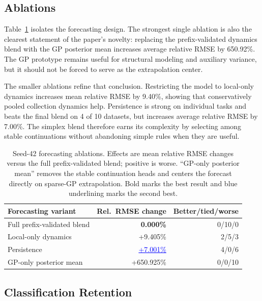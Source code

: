 \documentclass[11pt]{article}
\newcommand{\best}[1]{\textbf{#1}}
\newcommand{\second}[1]{\textcolor{blue}{\underline{#1}}}
\begin{document}
\subsection{Ablations}

Table~\ref{tab:forecast-ablations} isolates the forecasting design. The strongest single ablation is also the clearest statement of the paper's novelty: replacing the prefix-validated dynamics blend with the GP posterior mean increases average relative RMSE by 650.92\%. The GP prototype remains useful for structural modeling and auxiliary variance, but it should not be forced to serve as the extrapolation center.

The smaller ablations refine that conclusion. Restricting the model to local-only dynamics increases mean relative RMSE by 9.40\%, showing that conservatively pooled collection dynamics help. Persistence is strong on individual tasks and beats the final blend on 4 of 10 datasets, but increases average relative RMSE by 7.00\%. The simplex blend therefore earns its complexity by selecting among stable continuations without abandoning simple rules when they are useful.

\begin{table}[H]
\centering
\caption{Seed-42 forecasting ablations. Effects are mean relative RMSE changes versus the full prefix-validated blend; positive is worse. ``GP-only posterior mean'' removes the stable continuation heads and centers the forecast directly on sparse-GP extrapolation. Bold marks the best result and blue underlining marks the second best.}
\label{tab:forecast-ablations}
\small
\begin{tabular}{lrr}
\toprule
Forecasting variant & Rel.\ RMSE change & Better/tied/worse \\
\midrule
Full prefix-validated blend   & \best{0.000\%}    & 0/10/0 \\
Local-only dynamics           & +9.405\%   & 2/5/3 \\
Persistence                   & \second{+7.001\%}   & 4/0/6 \\
GP-only posterior mean        & +650.925\% & 0/0/10 \\
\bottomrule
\end{tabular}
\end{table}

\subsection{Classification Retention}
\end{document}
